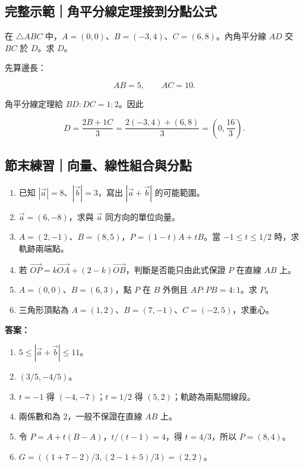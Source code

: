 \documentclass[11pt,a4paper]{article}
\providecommand{\tightlist}{%
  \setlength{\itemsep}{0pt}\setlength{\parskip}{0pt}}
\begin{document}
\begin{HandoutWorkedExample}

\subsection{完整示範｜角平分線定理接到分點公式}\label{ux5b8cux6574ux793aux7bc4ux89d2ux5e73ux5206ux7ddaux5b9aux7406ux63a5ux5230ux5206ux9edeux516cux5f0f}

在 \(\triangle ABC\) 中，\(A=(0,0)\)、\(B=(-3,4)\)、\(C=(6,8)\)。內角平分線 \(AD\) 交 \(BC\) 於 \(D\)。求 \(D\)。

先算邊長：

\[
AB=5,
\qquad
AC=10.
\]

角平分線定理給 \(BD:DC=1:2\)。因此

\[
D=\frac{2B+1C}{3}
=\frac{2(-3,4)+(6,8)}3
=\boxed{\left(0,\frac{16}{3}\right)}.
\]

\end{HandoutWorkedExample}

\begin{HandoutSelfCheck}

\subsection{節末練習｜向量、線性組合與分點}\label{ux7bc0ux672bux7df4ux7fd2ux5411ux91cfux7ddaux6027ux7d44ux5408ux8207ux5206ux9ede}

\begin{enumerate}
\def\labelenumi{\arabic{enumi}.}
\tightlist
\item
  已知 \(|\vec a|=8\)、\(|\vec b|=3\)，寫出 \(|\vec a+\vec b|\) 的可能範圍。
\item
  \(\vec a=(6,-8)\)，求與 \(\vec a\) 同方向的單位向量。
\item
  \(A=(2,-1)\)、\(B=(8,5)\)，\(P=(1-t)A+tB\)。當 \(-1\le t\le1/2\) 時，求軌跡兩端點。
\item
  若 \(\overrightarrow{OP}=k\overrightarrow{OA}+(2-k)\overrightarrow{OB}\)，判斷是否能只由此式保證 \(P\) 在直線 \(AB\) 上。
\item
  \(A=(0,0)\)、\(B=(6,3)\)，點 \(P\) 在 \(B\) 外側且 \(AP:PB=4:1\)。求 \(P\)。
\item
  三角形頂點為 \(A=(1,2)\)、\(B=(7,-1)\)、\(C=(-2,5)\)，求重心。
\end{enumerate}

\textbf{答案：}

\begin{enumerate}
\def\labelenumi{\arabic{enumi}.}
\tightlist
\item
  \(5\le|\vec a+\vec b|\le11\)。
\item
  \((3/5,-4/5)\)。
\item
  \(t=-1\) 得 \((-4,-7)\)；\(t=1/2\) 得 \((5,2)\)；軌跡為兩點間線段。
\item
  兩係數和為 \(2\)，一般不保證在直線 \(AB\) 上。
\item
  令 \(P=A+t(B-A)\)，\(t/(t-1)=4\)，得 \(t=4/3\)，所以 \(P=(8,4)\)。
\item
  \(G=((1+7-2)/3,(2-1+5)/3)=(2,2)\)。
\end{enumerate}

\end{HandoutSelfCheck}
\end{document}

